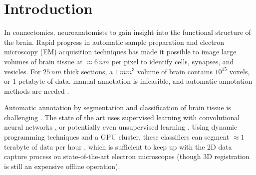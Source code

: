 \section{Introduction}


In connectomics, neuroanatomists  to gain insight into the functional structure of the brain. Rapid progress in automatic sample preparation and electron microscopy (EM) acquisition techniques has made it possible to image large volumes of brain tissue at $\approx6\, nm$ per pixel to identify cells, synapses, and vesicles. For $25\, nm$ thick sections, a $1\, mm^3$ volume of brain contains $10^{15}$ voxels, or 1 petabyte of data.  manual annotation is infeasible, and automatic annotation methods are needed \cite{jain2010,Liu2014,GALA2014,kaynig2015large}.

Automatic annotation by segmentation and classification of brain tissue is challenging \cite{isbi_challenge}. The state of the art uses supervised learning with convolutional neural networks \cite{Ciresan:2012f}, or potentially even unsupervised learning \cite{BogovicHJ13}.  Using dynamic programming techniques \cite{Masci:2013a} and a GPU cluster, these classifiers can segment $\approx1$ terabyte of data per hour \cite{kasthuri2015saturated}, which is sufficient to keep up with the 2D data capture process on state-of-the-art electron microscopes (though 3D registration is still an expensive offline operation).



